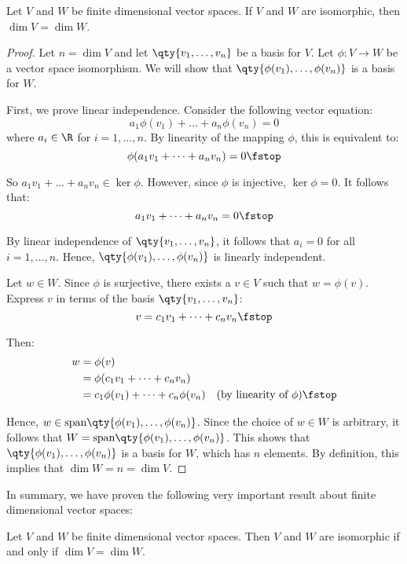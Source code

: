 \begin{proposition}
  Let \( V \) and \( W \) be finite dimensional vector spaces. If \( V \) and \( W \) are isomorphic, then \( \dim V=\dim W \).
\end{proposition}
\begin{proof}
  Let \( n=\dim V \) and let \( \qty{v_1,\dots,v_n} \) be a basis for \( V \). Let \( \phi:V\to W \) be a vector space isomorphism. We will show that \( \qty{\phi(v_1),\dots,\phi(v_n)} \) is a basis for \( W \).

  \vspace{3mm}

  First, we prove linear independence. Consider the following vector equation:
  \[ a_1\phi(v_1)+\dots+a_n\phi(v_n)=0 \]
  where \( a_i\in\R \) for \( i=1,\dots, n \). By linearity of the mapping \( \phi \), this is equivalent to:
  \[ \phi(a_1v_1+\dots+a_nv_n)=0\fstop \]
  
  So \( a_1v_1+\dots+a_nv_n\in\ker\phi \). However, since \( \phi \) is injective, \( \ker\phi=\qty{0} \). It follows that:
  \[ a_1v_1+\dots+a_nv_n=0\fstop \]
  
  By linear independence of \( \qty{v_1,\dots,v_n} \), it follows that \( a_i=0 \) for all \( i=1,\dots,n \). Hence, \( \qty{\phi(v_1),\dots,\phi(v_n)} \) is linearly independent.

  \vspace{3mm}

  Let \( w\in W \). Since \( \phi \) is surjective, there exists a \( v\in V \) such that \( w=\phi(v) \). Express \( v \) in terms of the basis \( \qty{v_1,\dots,v_n} \):
  \[ v=c_1v_1+\dots+c_nv_n\fstop \]
  
  Then:
  \begin{align*}
    w&= \phi(v)\\
    &= \phi(c_1v_1+\dots+c_nv_n)\\
    &= c_1\phi(v_1)+\dots+c_n\phi(v_n) &(\text{by linearity of }\phi)\fstop
  \end{align*}
  
  Hence, \( w\in\text{span}\qty{\phi(v_1),\dots,\phi(v_n)} \). Since the choice of \( w\in W \) is arbitrary, it follows that \( W=\text{span}\qty{\phi(v_1),\dots,\phi(v_n)} \). This shows that \( \qty{\phi(v_1),\dots,\phi(v_n)} \) is a basis for \( W \), which has \( n \) elements. By definition, this implies that \( \dim W=n=\dim V \).
\end{proof}

In summary, we have proven the following very important result about finite dimensional vector spaces:
\begin{theorem}
  Let \( V \) and \( W \) be finite dimensional vector spaces. Then \( V \) and \( W \) are isomorphic if and only if \( \dim V=\dim W \).
\end{theorem}

